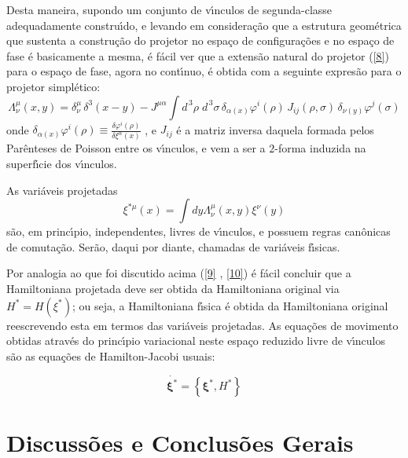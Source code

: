 \documentclass[a4paper,thmsa,12pt]{report}
\begin{document}
Desta maneira, supondo um conjunto de v\'{\i}nculos de segunda-classe
adequadamente constru\'{\i}do, e levando em considera\c{c}\~{a}o que a
estrutura geom\'{e}trica que sustenta a cons\-tru\-\c{c}\~{a}o do projetor no
espa\c{c}o de configura\c{c}\~{o}es e no espa\c{c}o de fase \'{e}
basicamente a mesma, \'{e} f\'{a}cil ver que a extens\~{a}o natural do
projetor (\ref{8}) para o espa\c{c}o de fase, agora no cont\'{\i}nuo, \'{e}
obtida com a seguinte expres\~{a}o para o projetor simpl\'{e}tico: 
\begin{equation}
\Lambda _{\nu }^{\mu }(x,y)=\delta _{\nu }^{\mu }\,\delta ^{3}(x-y)-J^{\mu
\alpha }\int d^{\,3}\!\rho \;d^{\,3}\!\sigma \,\delta _{\alpha (x)}\varphi
^{i}(\rho )\,J_{ij}(\rho ,\sigma )\,\delta _{\nu (y)}\varphi ^{j}(\sigma )
\label{12}
\end{equation}
onde $\delta _{\alpha (x)}\varphi ^{i}(\rho )\equiv \frac{\delta \varphi
^{i}(\rho )}{\delta \xi ^{\alpha }(x)}$ , e $J_{ij}$ \'{e} a matriz inversa
daquela formada pelos Par\^{e}nteses de Poisson entre os v\'{\i}nculos, e
vem a ser a $2$-forma induzida na superf\'{\i}cie dos v\'{\i}nculos.

As vari\'{a}veis projetadas 
\begin{equation}
\xi ^{*\mu }\left( x\right) =\int dy\Lambda _{\nu }^{\mu }(x,y)\xi ^{\nu
}\left( y\right)  \label{13}
\end{equation}
s\~{a}o, em princ\'{\i}pio, independentes, livres de v\'{\i}nculos, e
possuem regras can\^{o}nicas de comuta\c{c}\~{a}o. Ser\~{a}o, daqui por
diante, chamadas de vari\'{a}veis f\'{\i}sicas.

Por analogia ao que foi discutido acima (\ref{9} , \ref{10}) \'{e} f\'{a}cil
concluir que a Hamiltoniana projetada deve ser obtida da Hamiltoniana
original via $H^{\ast }=H\left( \xi ^{\ast }\right) $; ou seja, a
Hamiltoniana f\'{\i}sica \'{e} obtida da Hamiltoniana original reescrevendo
esta em termos das vari\'{a}veis projetadas. As equa\c{c}\~{o}es de
movimento obtidas atrav\'{e}s do princ\'{\i}pio variacional neste espa\c{c}o
reduzido livre de v\'{\i}nculos s\~{a}o as equa\c{c}\~{o}es de
Hamilton-Jacobi usuais:

\begin{equation}
\dot{{\mathbf{\xi}^\ast}}=\left\{ \mathbf{\xi }^{\ast},H^{\ast}\right\}
\label{14}
\end{equation}

\section{{\sc Discuss\~oes e Conclus\~oes Gerais}}
\end{document}
